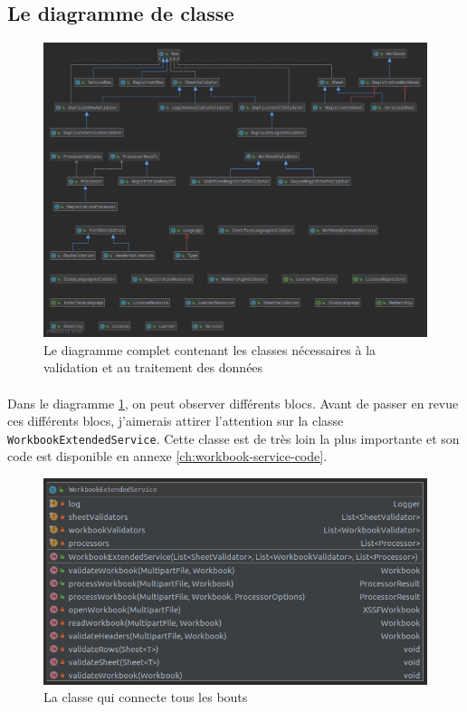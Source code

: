 \subsection{Le diagramme de classe}
\label{subsec:class-diagram}

\begin{figure}[ht]
    \centering
    \includegraphics[width=1\textwidth]{images/diagrams/clickandrun-class-diagram.png}
    \caption{Le diagramme complet contenant les classes nécessaires à la validation et au traitement des données}
    \label{fig:class-diagram-full}
\end{figure}

\paragraph{}
Dans le diagramme \ref{fig:class-diagram-full}, on peut observer différents blocs.
Avant de passer en revue ces différents blocs, j'aimerais attirer l'attention sur la classe \lstinline{WorkbookExtendedService}.
Cette classe est de très loin la plus importante et son code est disponible en annexe \ref{ch:workbook-service-code}.

\begin{figure}[ht]
    \centering
    \includegraphics[width=1\textwidth]{images/diagrams/workbook-service-class.png}
    \caption{La classe qui connecte tous les bouts}
    \label{fig:class-service}
\end{figure}


